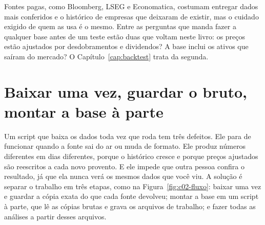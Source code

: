 Fontes pagas, como Bloomberg, LSEG e Economatica, costumam entregar dados mais conferidos e o histórico de empresas que deixaram de existir, mas o cuidado exigido de quem as usa é o mesmo. Entre as perguntas que \citet{chan2021} manda fazer a qualquer base antes de um teste estão duas que voltam neste livro: os preços estão ajustados por desdobramentos e dividendos? A base inclui os ativos que saíram do mercado? O Capítulo~\ref{cap:backtest} trata da segunda.

\section{Baixar uma vez, guardar o bruto, montar a base à parte}
\label{sec:c02-congelar}

Um script que baixa os dados toda vez que roda tem três defeitos. Ele para de funcionar quando a fonte sai do ar ou muda de formato. Ele produz números diferentes em dias diferentes, porque o histórico cresce e porque preços ajustados são reescritos a cada novo provento. E ele impede que outra pessoa confira o resultado, já que ela nunca verá os mesmos dados que você viu. A solução é separar o trabalho em três etapas, como na Figura~\ref{fig:c02-fluxo}: baixar uma vez e guardar a cópia exata do que cada fonte devolveu; montar a base em um script à parte, que lê as cópias brutas e grava os arquivos de trabalho; e fazer todas as análises a partir desses arquivos.

